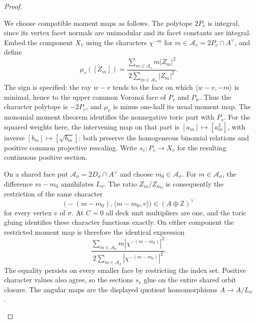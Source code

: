 \begin{proof}
\begin{enumerate}[label=\arabic*.]
We choose compatible moment maps as follows.  The polytope $2P_v$
is integral, since its vertex facet normals are unimodular and its
facet constants are integral.  Embed the component $X_v$ using the
characters $\chi^{-m}$ for
$m\in\mathcal A_v=2P_v\cap A^\vee$, and define
\[
 \mu_v([Z_m])=
 \frac{\sum_{m\in\mathcal A_v}m|Z_m|^2}
 {2\sum_{m\in\mathcal A_v}|Z_m|^2}.
\]
The sign is specified: the ray $w-v$ tends to the face on which
$\langle w-v,-m\rangle$ is minimal, hence to the upper common
Voronoi face of $P_v$ and $P_w$.  Thus the character polytope is
$-2P_v$, and $\mu_v$ is minus one-half its usual moment map.
The monomial moment theorem
\cite[equations (12.2.3)--(12.2.4) and Theorem 12.2.5, p.~571]{CoxLittleSchenck2011}
identifies the nonnegative toric part with $P_v$.
For the squared weights here, the intervening map on that part is
$[a_m]\mapsto[a_m^2]$, with inverse $[b_m]\mapsto[\sqrt{b_m}]$:
both preserve the homogeneous binomial relations and positive common
projective rescaling.  Write $s_v:P_v\to X_v$ for the resulting
continuous positive section.

On a shared face put
$\mathcal A_\sigma=2D_\sigma\cap A^\vee$ and choose
$m_0\in\mathcal A_\sigma$.
For $m\in\mathcal A_\sigma$, the difference $m-m_0$ annihilates
$L_\sigma$.  The ratio $Z_m/Z_{m_0}$ is consequently the restriction
of the same character
\[
 \bigl(-(m-m_0),\langle m-m_0,v\rangle\bigr)
       \in(A\oplus\mathbb Z)^\vee
\]
for every vertex $v$ of $\sigma$.  At $C=0$ all deck unit multipliers are one, and the toric gluing
identifies these character functions exactly.  On either component
the restricted moment map is therefore the identical expression
\[
 \frac{\sum_{m\in\mathcal A_\sigma}
       m|\chi^{-(m-m_0)}|^2}
 {2\sum_{m\in\mathcal A_\sigma}|\chi^{-(m-m_0)}|^2}.
\]
The equality persists on every smaller face by restricting the index
set.  Positive character values also agree, so the sections $s_v$
glue on the entire shared orbit closure.  The angular maps are the
displayed quotient homomorphisms $A\to A/L_\sigma$.


\end{enumerate}
\end{proof}
